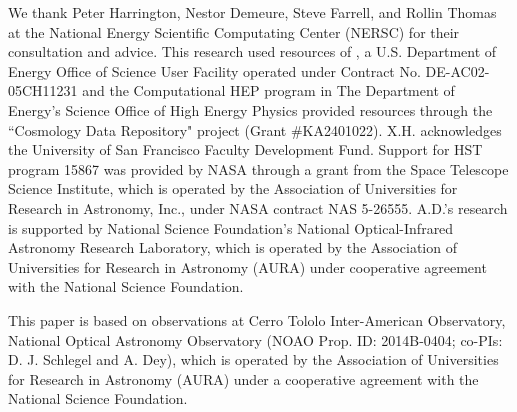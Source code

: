 We thank Peter Harrington, Nestor Demeure, Steve Farrell, and Rollin Thomas at the National Energy Scientific Computating Center (NERSC) for their consultation and advice.
This research used resources of , a U.S. Department of Energy Office of Science User Facility operated under Contract No. DE-AC02-05CH11231 and the Computational HEP program in The Department of Energy's Science Office of High Energy Physics provided resources through the ``Cosmology Data Repository" project (Grant \#KA2401022).
X.H. acknowledges the
University of San Francisco Faculty Development Fund.
Support for HST program 15867 was provided by NASA
through a grant from the Space Telescope Science Institute,
which is operated by the Association of Universities for
Research in Astronomy, Inc., under NASA contract NAS
5-26555.
A.D.'s research is supported by National Science Foundation's National Optical-Infrared Astronomy Research Laboratory, 
which is operated by the Association of Universities for Research in Astronomy (AURA) under cooperative agreement with the National Science Foundation.

This paper is based on observations at Cerro Tololo Inter-American Observatory, National Optical
Astronomy Observatory (NOAO Prop. ID: 2014B-0404; co-PIs: D. J. Schlegel and A. Dey), which is operated by the Association of
Universities for Research in Astronomy (AURA) under a cooperative agreement with the
National Science Foundation.


